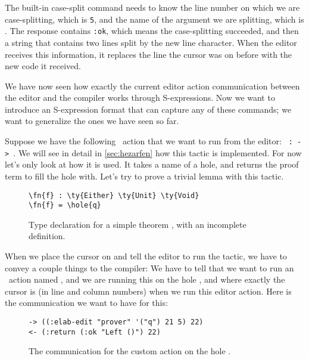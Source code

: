 The built-in case-split command needs to know the line number on which we are
case-splitting, which is \texttt{5}, and the name of the argument we are
splitting, which is .  The response contains \texttt{:ok}, which means
the case-splitting succeeded, and then a string that contains two lines split
by the new line character. When the editor receives this information, it
replaces the line the cursor was on before with the new code it received.

We have now seen how exactly the current editor action communication between
the editor and the compiler works through S-expressions.
Now we want to introduce an S-expression format that can capture any of these
commands; we want to generalize the ones we have seen so far.

Suppose we have the following \Elab\ action that we want to run from the editor:
\texttt{ :  ->  }.
We will see in detail in \autoref{sec:hezarfen} how this tactic is
implemented. For now let's only look at how it is used. It takes a name of a
hole, and returns the proof term to fill the hole with.
Let's try to prove a trivial lemma with this tactic.

\begin{figure}[ht]
\caption{Type declaration for a simple theorem , with an incomplete definition.}
\begin{Verbatim}[framesep=2mm, label=\footnotesize{\normalfont{Idris}}, labelposition=topline]
\fn{f} : \ty{Either} \ty{Unit} \ty{Void}
\fn{f} = \hole{q}
\end{Verbatim}
\end{figure}

When we place the cursor on  and tell the editor to run the 
tactic, we have to convey a couple things to the compiler: We have to tell that
we want to run an \Elab\ action named , and we are running this on
the hole , and where exactly the cursor is (in line and column numbers)
when we run this editor action. Here is the communication we want to have for this:

\begin{figure}[ht]
\caption{The communication for the custom  action on the hole .}
\begin{Verbatim}[framesep=2mm, label=\footnotesize{\normalfont{S-expression}}, labelposition=topline]
-> ((:elab-edit "prover" '("q") 21 5) 22)
<- (:return (:ok "Left ()") 22)
\end{Verbatim}
\end{figure}

